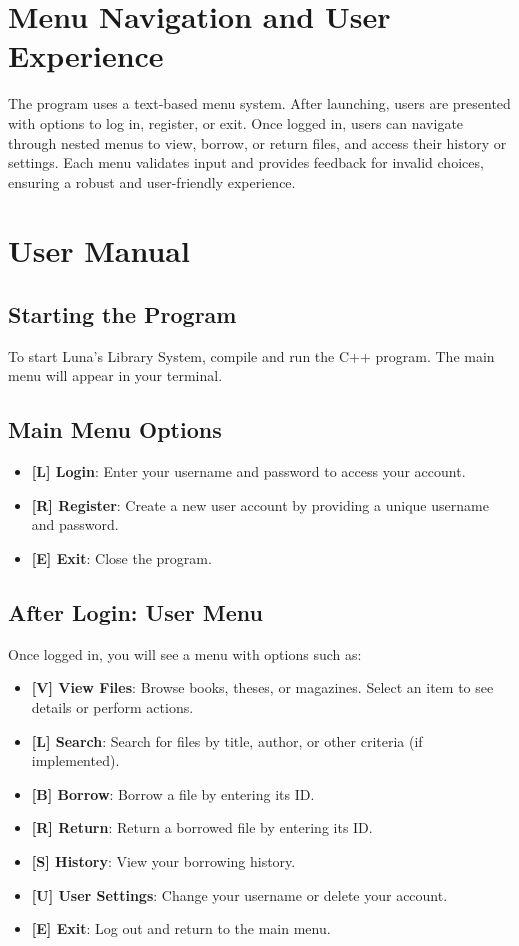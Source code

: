 \documentclass[a4paper,12pt]{article}
\begin{document}
\section{Menu Navigation and User Experience}
The program uses a text-based menu system. After launching, users are presented with options to log in, register, or exit. Once logged in, users can navigate through nested menus to view, borrow, or return files, and access their history or settings. Each menu validates input and provides feedback for invalid choices, ensuring a robust and user-friendly experience.

\section{User Manual}

\subsection{Starting the Program}
To start Luna's Library System, compile and run the C++ program. The main menu will appear in your terminal.

\subsection{Main Menu Options}
\begin{itemize}
    \item \textbf{[L] Login}: Enter your username and password to access your account.
    \item \textbf{[R] Register}: Create a new user account by providing a unique username and password.
    \item \textbf{[E] Exit}: Close the program.
\end{itemize}

\subsection{After Login: User Menu}
Once logged in, you will see a menu with options such as:
\begin{itemize}
    \item \textbf{[V] View Files}: Browse books, theses, or magazines. Select an item to see details or perform actions.
    \item \textbf{[L] Search}: Search for files by title, author, or other criteria (if implemented).
    \item \textbf{[B] Borrow}: Borrow a file by entering its ID.
    \item \textbf{[R] Return}: Return a borrowed file by entering its ID.
    \item \textbf{[S] History}: View your borrowing history.
    \item \textbf{[U] User Settings}: Change your username or delete your account.
    \item \textbf{[E] Exit}: Log out and return to the main menu.
\end{itemize}
\end{document}
